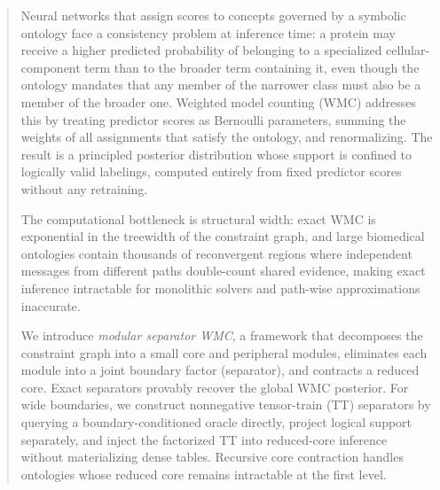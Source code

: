 
\begin{abstract}
Neural networks that assign scores to concepts governed by a symbolic
ontology face a consistency problem at inference time: a protein may
receive a higher predicted probability of belonging to a specialized
cellular-component term than to the broader term containing it, even
though the ontology mandates that any member of the narrower class must
also be a member of the broader one. Weighted model counting (WMC)
addresses this by treating predictor scores as Bernoulli parameters,
summing the weights of all assignments that satisfy the ontology, and
renormalizing. The result is a principled posterior distribution whose
support is confined to logically valid labelings, computed entirely from
fixed predictor scores without any retraining.

The computational bottleneck is structural width: exact WMC is
exponential in the treewidth of the constraint graph, and large
biomedical ontologies contain thousands of reconvergent regions where
independent messages from different paths double-count shared evidence,
making exact inference intractable for monolithic solvers and path-wise
approximations inaccurate.

We introduce \emph{modular separator WMC}, a framework that
decomposes the constraint graph into a small core and peripheral
modules, eliminates each module into a joint boundary factor (separator),
and contracts a reduced core. Exact separators provably recover the
global WMC posterior. For wide boundaries, we construct nonnegative
tensor-train (TT) separators by querying a boundary-conditioned
oracle directly, project logical support separately, and inject the
factorized TT into reduced-core inference without materializing dense
tables. Recursive core contraction handles ontologies whose reduced
core remains intractable at the first level.


\end{abstract}
